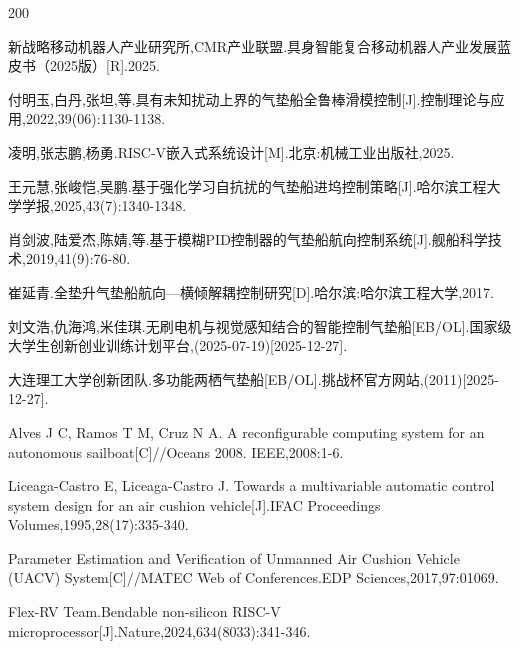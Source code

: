 \begin{thebibliography}{200}  
\setlength{\itemsep}{0pt}      %
\setlength{\parskip}{0pt}       %

新战略移动机器人产业研究所,CMR产业联盟.具身智能复合移动机器人产业发展蓝皮书（2025版）[R].2025.

付明玉,白丹,张坦,等.具有未知扰动上界的气垫船全鲁棒滑模控制[J].控制理论与应用,2022,39(06):1130-1138.

凌明,张志鹏,杨勇.RISC-V嵌入式系统设计[M].北京:机械工业出版社,2025.

王元慧,张峻恺,吴鹏.基于强化学习自抗扰的气垫船进坞控制策略[J].哈尔滨工程大学学报,2025,43(7):1340-1348.

肖剑波,陆爱杰,陈婧,等.基于模糊PID控制器的气垫船航向控制系统[J].舰船科学技术,2019,41(9):76-80.

崔延青.全垫升气垫船航向—横倾解耦控制研究[D].哈尔滨:哈尔滨工程大学,2017.

刘文浩,仇海鸿,米佳琪.无刷电机与视觉感知结合的智能控制气垫船[EB/OL].国家级大学生创新创业训练计划平台,(2025-07-19)[2025-12-27].

大连理工大学创新团队.多功能两栖气垫船[EB/OL].挑战杯官方网站,(2011)[2025-12-27].

Alves J C, Ramos T M, Cruz N A. A reconfigurable computing system for an autonomous sailboat[C]//Oceans 2008. IEEE,2008:1-6.

Liceaga-Castro E, Liceaga-Castro J. Towards a multivariable automatic control system design for an air cushion vehicle[J].IFAC Proceedings Volumes,1995,28(17):335-340.

Parameter Estimation and Verification of Unmanned Air Cushion Vehicle (UACV) System[C]//MATEC Web of Conferences.EDP Sciences,2017,97:01069.

Flex-RV Team.Bendable non-silicon RISC-V microprocessor[J].Nature,2024,634(8033):341-346.

    
\end{thebibliography}